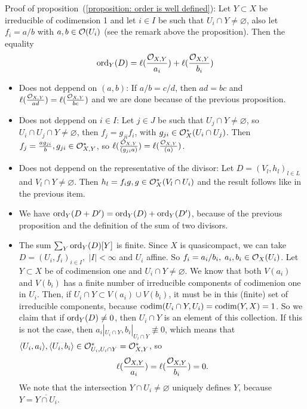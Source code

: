 Proof of proposition~(\ref{proposition: order is well defined}): Let 
$Y\subset X$ be irreducible of codimension 1 and let $i\in I$ be such that 
$U_i\cap Y\neq\varnothing$, also let $f_i = a/b$ with $a,b\in\mathcal{O}(U_i)$ (see the remark above the proposition). 
Then the equality 
\begin{equation}
    \text{ord}_Y(D) = \ell(\frac{\mathcal{O}_{X,Y}}{a_i}) + \ell(\frac{\mathcal{O}_{X,Y}}{b_i})
\end{equation}
\begin{itemize}
    \item[(1)] Does not deppend on $(a,b)$: If $a/b=c/d$, then $ad=bc$ and 
    $\ell(\tfrac{\mathcal{O}_{X,Y}}{ad})=\ell(\tfrac{\mathcal{O}_{X,Y}}{bc})$ and we are done because 
    of the previous proposition. 
    \item[(2)] Does not deppend on $i\in I$: Let $j\in J$ be such that $U_j\cap Y\neq\varnothing$, so 
    $U_i\cap U_j\cap Y\neq\varnothing$, then $f_j = g_{ji} f_i$, with $g_{ji}\in\mathcal{O}_X^*(U_i\cap U_j)$. 
    Then $f_j = \tfrac{ag_{ji}}{b}, g_{ji}\in\mathcal{O}_{X,Y}^*$, so $\ell(\tfrac{\mathcal{O}_{X,Y}}{(g_{ji}a)})=
    \ell(\tfrac{\mathcal{O}_{X,Y}}{(a)})$.
    \item[(3)] Does not deppend on the representative of the divisor: Let $D = (V_l, h_l)_{l\in L}$
    and $V_l\cap Y\neq\varnothing$. Then $h_l = f_i g, g\in\mathcal{O}_X^*(V_l\cap U_i)$ and the result follows 
    like in the previous item.
    \item[(4)] We have $\text{ord}_Y(D+D^\prime) = \text{ord}_Y(D)+\text{ord}_Y(D^\prime)$, because of the previous proposition 
    and the definition of the sum of two divisors.
    \item[(5)] The sum $\sum_Y\text{ord}_Y(D)[Y]$ is finite. Since $X$ is quasicompact, we can take 
    $D=(U_i, f_i)_{i\in I},\; |I|<\infty$ and $U_i$ affine. So $f_i = a_i/b_i,\;a_i,b_i\in\mathcal{O}_X(U_i)$. 
    Let $Y\subset X$ be of codimension one and $U_i\cap Y\neq\varnothing$. We know that both 
    $V(a_i)$ and $V(b_i)$ has a finite number of irreducible components of codimenion one in $U_i$. 
    Then, if $U_i\cap Y\subset V(a_i)\cup V(b_i)$, it must be in this (finite) set of irreducible components, because 
    $\text{codim}(U_i\cap Y, U_i)=\text{codim} (Y,X)=1$. So we claim that if 
    $\text{ord}_Y(D)\neq0$, then $U_i\cap Y$ is an element of this collection. If this is not the case, then 
    $a_i|_{U_i\cap Y},b_i|_{U_i\cap Y}\not\equiv0$, which means that 
    $\langle U_i, a_i\rangle , \langle U_i, b_i\rangle \in \mathcal{O}_{U_i,U_i\cap Y}^*=\mathcal{O}_{X,Y}^*$, so 
    \begin{equation}
    \ell(\frac{\mathcal{O}_{X,Y}}{a_i}) = \ell(\frac{\mathcal{O}_{X,Y}}{b_i}) = 0.
    \end{equation}
    We note that the intersection $Y\cap U_i\neq\varnothing$ uniquely defines $Y$, because $Y=\overline{Y\cap U_i}$.
\end{itemize}

